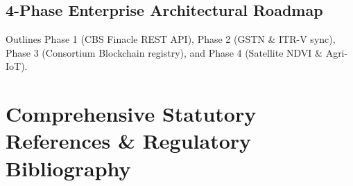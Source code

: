 \documentclass[11pt,a4paper,oneside]{report}
\begin{document}
\section{4-Phase Enterprise Architectural Roadmap}
Outlines Phase 1 (CBS Finacle REST API), Phase 2 (GSTN \& ITR-V sync), Phase 3 (Consortium Blockchain registry), and Phase 4 (Satellite NDVI \& Agri-IoT).

\newpage
\chapter*{Comprehensive Statutory References \& Regulatory Bibliography}
\end{document}
